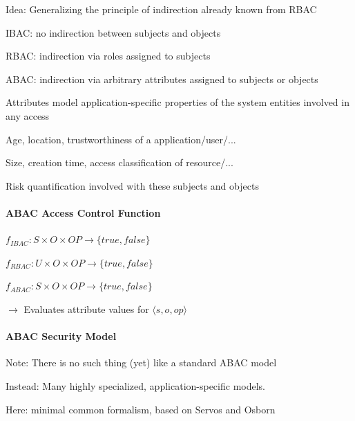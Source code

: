 \documentclass[a4paper]{article}
\begin{document}
\begin{multicols}{3}
    Idea: Generalizing the principle of indirection already known from RBAC
    \begin{itemize*}
        \item IBAC: no indirection between subjects and objects
        \item RBAC: indirection via roles assigned to subjects
        \item ABAC: indirection via arbitrary attributes assigned to subjects or objects
        \item Attributes model application-specific properties of the system entities involved in any access
        \begin{itemize*}
            \item Age, location, trustworthiness of a application/user/...
            \item Size, creation time, access classification of resource/...
            \item Risk quantification involved with these subjects and objects
        \end{itemize*}
    \end{itemize*}

    \paragraph{ABAC Access Control Function}
    \begin{itemize*}
        \item $f_{IBAC}:S\times O\times OP\rightarrow\{true,false\}$
        \item $f_{RBAC}:U\times O\times OP\rightarrow\{true,false\}$
        \item $f_{ABAC}:S\times O\times OP\rightarrow\{true,false\}$
        \item $\rightarrow$ Evaluates attribute values for $\langle s,o,op\rangle$
    \end{itemize*}

    \paragraph{ABAC Security Model}
    \begin{itemize*}
        \item Note: There is no such thing (yet) like a standard ABAC model
        \item Instead: Many highly specialized, application-specific models.
        \item Here: minimal common formalism, based on Servos and Osborn
    \end{itemize*}


\end{multicols}
\end{document}
